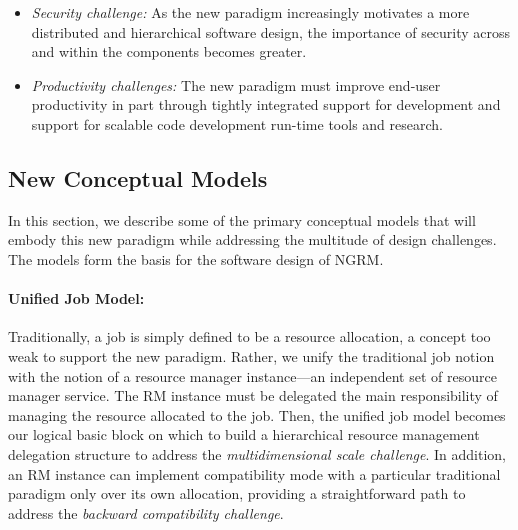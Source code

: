 \documentclass{article}
\newcommand{\ngrm}{NGRM}
\begin{document}
\begin{itemize}
\item{\sl Security challenge:} As the new paradigm increasingly motivates
     a more distributed and hierarchical software design, 
     the importance of security across and within the components becomes greater.

\item{\sl Productivity challenges:} The new paradigm must improve end-user 
     productivity in part through tightly integrated support for development
     and support for scalable code development run-time tools and research.

\end{itemize}


\subsection{New Conceptual Models}
In this section, we describe some of the primary conceptual models that will embody 
this new paradigm while addressing the multitude of design challenges. 
The models form the basis for the software design of \ngrm.

\paragraph{Unified Job Model:}
Traditionally, a job is simply defined to be a resource allocation, 
a concept too weak to support the new paradigm. 
Rather, we unify the traditional job notion 
with the notion of a resource manager instance---an independent set of resource manager service.
The RM instance must be delegated the main responsibility of managing the resource allocated to the job.
Then, the unified job model becomes our logical basic block
on which to build a hierarchical resource management 
delegation structure to address the {\sl multidimensional scale challenge}.
In addition, an RM instance can implement compatibility mode with a particular 
traditional paradigm only over its own allocation, providing a straightforward path to address
the {\sl backward compatibility challenge}. 
\end{document}
